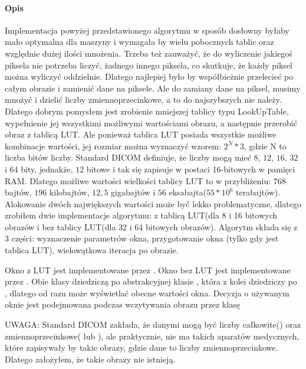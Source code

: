 \paragraph{Opis}
\par
Implementacja powyżej przedstawionego algorytmu w sposób dosłowny byłaby mało optymalna dla maszyny i wymagała by wielu pobocznych tablic oraz względnie dużej ilości mnożenia.
Trzeba też zauważyć, że do wyliczenie jakiegoś piksela nie potrzeba liczyć, żadnego innego piksela, co skutkuje, że każdy piksel można wyliczyć oddzielnie.
Dlatego najlepiej było by współbieżnie przelecieć po całym obrazie i zamienić dane na piksele.
Ale do zamiany dane na piksel, musimy mnożyć i dzielić liczby zmiennoprzecinkowe, a to do najszybszych nie należy.
Dlatego dobrym pomysłem jest zrobienie mniejszej tablicy typu LookUpTable, wypełnienie jej wszystkimi możliwymi wartościami obrazu, a następnie przerobić obraz z tablicą LUT.
Ale ponieważ tablica LUT posiada wszystkie możliwe kombinacje wartości, jej rozmiar można wyznaczyć wzorem: $2^N*3$, gdzie N to liczba bitów liczby.
Standard DICOM definiuje, że liczby mogą mieć $8$, $12$, $16$, $32$ i $64$ bity, jednakże, $12$ bitowe i tak się zapisuje w postaci 16-bitowych w pamięci RAM.
Dlatego możliwe wartości wielkości tablicy LUT to w przybliżeniu: $768$ bajtów, $196$ kilobajtów, $12,5$ gigabajtów i $56$ eksabajta($55*10^{6}$ terabajtów).
Alokowanie dwóch największych wartości może być lekko problematyczne, dlatego zrobiłem dwie implementacje algorytmu: z tablicą LUT(dla 8 i 16 bitowych obrazów i bez tablicy LUT(dla 32 i 64 bitowych obrazów).
Algorytm składa się z 3 części: wyznaczenie parametrów okna, przygotowanie okna (tylko gdy jest tablica LUT), wielowątkowa iteracja po obrazie.
\par
Okno z LUT jest implementowane przez .
Okno bez LUT jest implementowane przez .
Obie klasy dziedziczą po abstrakcyjnej klasie , która z kolei dziedziczy po , dlatego od razu może wyświetlać obecne wartości okna.
Decyzja o używanym oknie jest podejmowana podczas wczytywania obrazu przez klasę 
\par
UWAGA: Standard DICOM zakłada, że danymi mogą być liczby całkowite() oraz zmiennoprzecinkowe( lub ), ale praktycznie, nie ma takich aparatów medycznych, które zapisywały by takie obrazy, gdzie dane to liczby zmiennoprzecinkowe. Dlatego założyłem, że takie obrazy nie istnieją.

